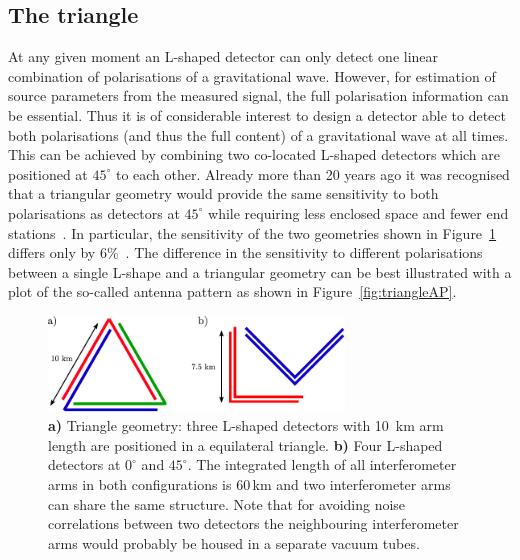 \FloatBarrier
\subsection{The triangle}
At any given moment an L-shaped detector can only detect one linear combination of polarisations of a
gravitational wave. However, for
estimation of source parameters from the measured signal, the full polarisation information can be essential.
Thus it is of considerable interest to design a detector able to detect both polarisations (and thus the full content)
of a gravitational wave at all times. This can be achieved by combining two co-located
L-shaped detectors which are positioned at $45^\circ$ to each other. %
Already more than 20 years ago it was recognised that a triangular geometry would provide the same
sensitivity to both polarisations as detectors at $45^\circ$ while requiring less enclosed space and fewer
end stations~\cite{Winkler86}. In particular, the sensitivity of the two geometries shown
in Figure~\ref{fig:triangle} differs only by $6\%$~\cite{Freise09}. The difference in the sensitivity to
different polarisations between a single L-shape and a triangular geometry can be best illustrated
with a plot of the so-called antenna pattern as shown in Figure~\ref{fig:triangleAP}.

\begin{figure}[tbh]
\begin{center}
\includegraphics[width=0.7\textwidth,keepaspectratio]{TRIMI03}
\caption{{\bf a)} Triangle geometry: three L-shaped detectors with 10\, km arm length
are positioned in a equilateral triangle.
{\bf b)} Four L-shaped detectors at $0^\circ$ and $45^\circ$. The integrated length of all
interferometer arms in both configurations is 60\,km and two interferometer arms can share
the same structure. Note that for avoiding noise correlations between two detectors the
neighbouring interferometer arms would probably be housed in a separate vacuum tubes.}
\label{fig:triangle}
\end{center}
\end{figure}

